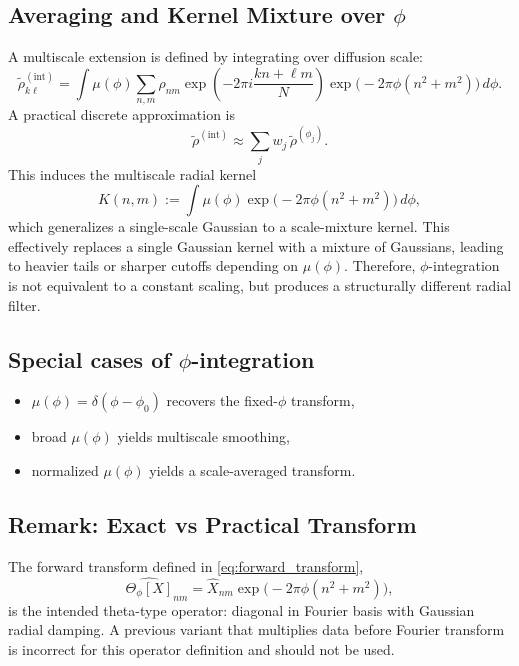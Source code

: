 \documentclass[11pt]{article}
\begin{document}
\subsection*{Averaging and Kernel Mixture over $\phi$}
A multiscale extension is defined by integrating over diffusion scale:
\begin{equation}
\widetilde{\rho}^{(\mathrm{int})}_{k\ell} = \int \mu(\phi) \sum_{n,m} \rho_{nm}
\exp\!\left(-2\pi i\frac{kn+\ell m}{N}\right)
\exp\!\big(-2\pi\phi(n^2+m^2)\big)\, d\phi.
\label{eq:phi_integrated_transform}
\end{equation}
A practical discrete approximation is
\begin{equation}
\widetilde{\rho}^{(\mathrm{int})} \approx \sum_j w_j\,\widetilde{\rho}^{(\phi_j)}.
\label{eq:phi_integrated_discrete}
\end{equation}
This induces the multiscale radial kernel
\begin{equation}
K(n,m):=\int \mu(\phi)\exp\!\big(-2\pi\phi(n^2+m^2)\big)\,d\phi,
\label{eq:multiscale_kernel}
\end{equation}
which generalizes a single-scale Gaussian to a scale-mixture kernel.
This effectively replaces a single Gaussian kernel with a mixture of Gaussians, leading to heavier tails or sharper cutoffs depending on $\mu(\phi)$.
Therefore, $\phi$-integration is not equivalent to a constant scaling, but produces a structurally different radial filter.

\subsection*{Special cases of $\phi$-integration}
\begin{itemize}
    \item $\mu(\phi)=\delta(\phi-\phi_0)$ recovers the fixed-$\phi$ transform,
    \item broad $\mu(\phi)$ yields multiscale smoothing,
    \item normalized $\mu(\phi)$ yields a scale-averaged transform.
\end{itemize}

\subsection*{Remark: Exact vs Practical Transform}
The forward transform defined in \eqref{eq:forward_transform},
\[
\widehat{\Theta_{\phi}[X]}_{nm}=\widehat{X}_{nm}\exp\!\big(-2\pi\phi(n^2+m^2)\big),
\]
is the intended theta-type operator: diagonal in Fourier basis with Gaussian radial damping. A previous variant that multiplies data before Fourier transform is incorrect for this operator definition and should not be used.
\end{document}

